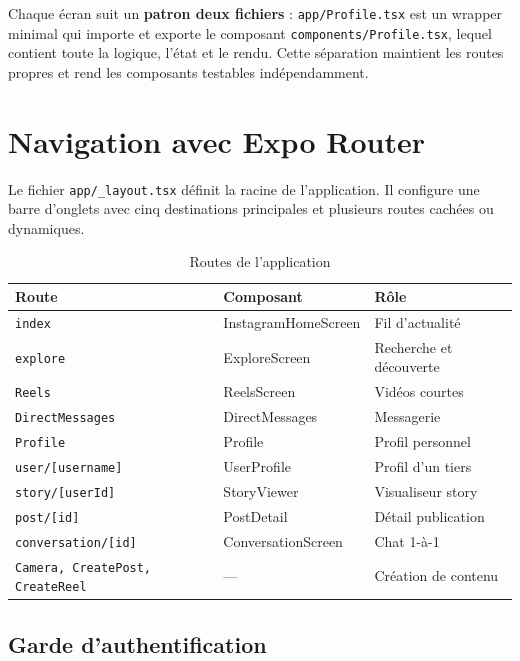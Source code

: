 Chaque écran suit un \textbf{patron deux fichiers} : \texttt{app/Profile.tsx} est un wrapper minimal qui importe et exporte le composant \texttt{components/Profile.tsx}, lequel contient toute la logique, l'état et le rendu. Cette séparation maintient les routes propres et rend les composants testables indépendamment.

\section{Navigation avec Expo Router}

Le fichier \texttt{app/\_layout.tsx} définit la racine de l'application. Il configure une barre d'onglets avec cinq destinations principales et plusieurs routes cachées ou dynamiques.

\begin{table}[H]
  \centering\small
  \begin{tabular}{@{}lll@{}}
    \toprule
    \textbf{Route} & \textbf{Composant} & \textbf{Rôle} \\
    \midrule
    \texttt{index}          & InstagramHomeScreen & Fil d'actualité \\
    \texttt{explore}        & ExploreScreen       & Recherche et découverte \\
    \texttt{Reels}          & ReelsScreen         & Vidéos courtes \\
    \texttt{DirectMessages} & DirectMessages      & Messagerie \\
    \texttt{Profile}        & Profile             & Profil personnel \\
    \midrule
    \texttt{user/[username]}    & UserProfile      & Profil d'un tiers \\
    \texttt{story/[userId]}     & StoryViewer      & Visualiseur story \\
    \texttt{post/[id]}          & PostDetail       & Détail publication \\
    \texttt{conversation/[id]}  & ConversationScreen & Chat 1-à-1 \\
    \texttt{Camera, CreatePost, CreateReel} & --- & Création de contenu \\
    \bottomrule
  \end{tabular}
  \caption{Routes de l'application}
\end{table}

\subsection{Garde d'authentification}

